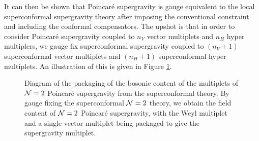 It can then be shown that Poincar\'e supergravity is gauge equivalent to the local superconformal supergravity theory after imposing the conventional constraint and including the conformal compensators. The upshot is that in order to consider Poincar\'e supergravity coupled to $n_V$ vector multiplets and $n_H$ hyper multiplers, we gauge fix superconformal supergravity coupled to $(n_V + 1)$ superconformal vector multiplets and $(n_H + 1)$ superconformal hyper multiplets. An illustration of this is given in Figure \ref{fig:combination}.

\begin{figure}
\centering
{}
\caption[Diagram of the packaging of the bosonic content of the multiplets of $\N = 2$ Poincar\'e supergravity from the superconformal theory]{Diagram of the packaging of the bosonic content of the multiplets of $\N = 2$ Poincar\'e supergravity from the superconformal theory. By gauge fixing the superconformal $\N = 2$ theory, we obtain the field content of $\N = 2$ Poincar\'e supergravity, with the Weyl multiplet and a single vector multiplet being packaged to give the supergravity multiplet.}
\label{fig:combination}
\end{figure}

